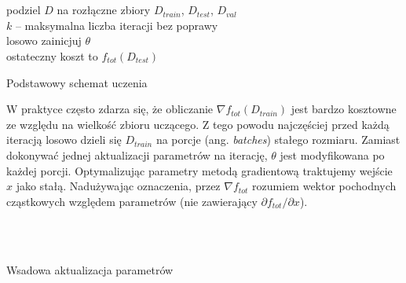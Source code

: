 \begin{algorithm}[h]
    \\\\podziel $D$ na rozłączne zbiory $D_{train}$, $D_{test}$, $D_{val}$\\
    $k$ -- maksymalna liczba iteracji bez poprawy\\[5pt]
    losowo zainicjuj $\theta$\\
    ostateczny koszt to $f_{tot}(D_{test})$
    \caption{Podstawowy schemat uczenia}
\end{algorithm}

W praktyce często zdarza się, że obliczanie $\nabla f_{tot}(D_{train})$ jest bardzo kosztowne ze względu na wielkość zbioru uczącego. Z tego powodu najczęściej przed każdą iteracją losowo dzieli się $D_{train}$ na porcje (ang. \textit{batches}) stałego rozmiaru. Zamiast dokonywać jednej aktualizacji parametrów na iterację, $\theta$ jest modyfikowana po każdej porcji. Optymalizując parametry metodą gradientową traktujemy wejście $x$ jako stałą. Nadużywając oznaczenia, przez $\nabla f_{tot}$ rozumiem wektor pochodnych cząstkowych względem parametrów (nie zawierający $\partial f_{tot} / \partial x$).

\begin{algorithm}[h]
    \\\\
    \caption{Wsadowa aktualizacja parametrów}
\end{algorithm}


